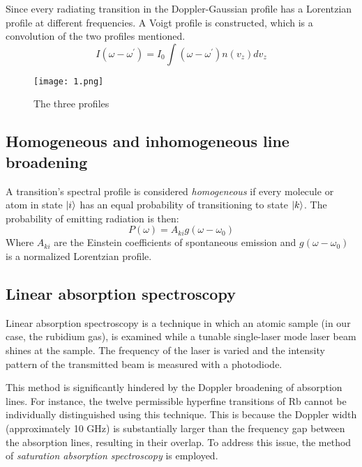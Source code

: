 \documentclass{article}
\DeclarePairedDelimiter\ket{\lvert}{\rangle}
\begin{document}
Since every radiating transition in the Doppler-Gaussian profile has a Lorentzian profile at different frequencies. A Voigt profile is constructed, which is a convolution of the two profiles mentioned. 
\begin{equation}    
    I\left(\omega-\omega^{\prime}\right)=I_0 \int\left(\omega-\omega^{\prime}\right) n\left(v_z\right) d v_z
\end{equation}

\begin{figure}
    \centering \texttt{[image: 1.png]}
    \caption{The three profiles}
    \label{fig:enter-label}
\end{figure}

\subsection{Homogeneous and inhomogeneous line broadening}

A transition's spectral profile is considered \textit{homogeneous} if every molecule or atom in state $\ket{i}$ has an equal probability of transitioning to state $\ket{k}$. The probability of emitting radiation is then: 
\begin{equation}
   P(\omega) = A_{ki}g(\omega-\omega_0) 
\end{equation}
Where $A_{ki}$ are the Einstein coefficients of spontaneous emission and $g(\omega-\omega_0)$ is a normalized Lorentzian profile. 

\subsection{Linear absorption spectroscopy} 
Linear absorption spectroscopy is a technique in which an atomic sample (in our case, the rubidium gas), is examined while a tunable single-laser mode laser beam shines at the sample. The frequency of the laser is varied and the intensity pattern of the transmitted beam is measured with a photodiode. 

This method is significantly hindered by the Doppler broadening of absorption lines. For instance, the twelve permissible hyperfine transitions of Rb cannot be individually distinguished using this technique. This is because the Doppler width (approximately 10 GHz) is substantially larger than the frequency gap between the absorption lines, resulting in their overlap. To address this issue, the method of \textit{saturation absorption spectroscopy} is employed.
\end{document}
